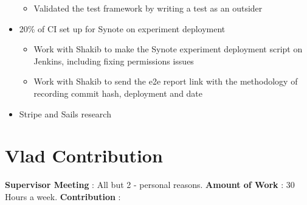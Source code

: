 \begin{itemize}
		\begin{itemize}
			\item Validated the test framework by writing a test as an outsider
		\end{itemize}
	\item 20\% of CI set up for Synote on experiment deployment
		\begin{itemize}
			\item Work with Shakib to make the Synote experiment deployment script on Jenkins, including fixing permissions issues
			\item Work with Shakib to send the e2e report link with the methodology of recording commit hash, deployment and date
		\end{itemize}
	\item Stripe and Sails research
\end{itemize}

\section{Vlad Contribution}
\label{sec:vlad-contribution}
\textbf{Supervisor Meeting} : All but 2 - personal reasons.
\textbf{Amount of Work} : 30 Hours a week.
\textbf{Contribution} : 

